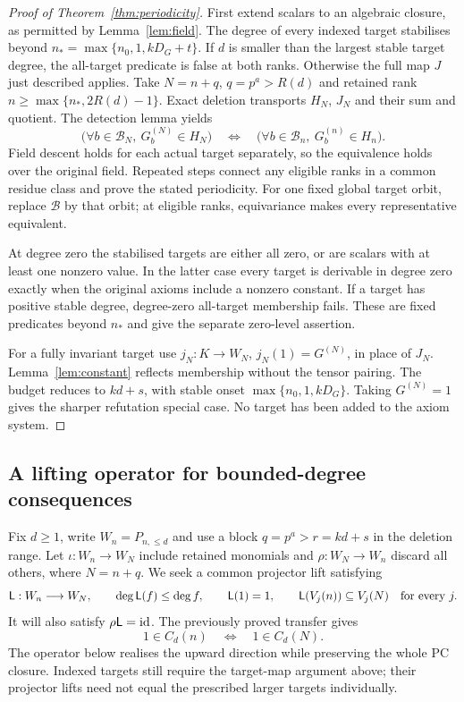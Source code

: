 \documentclass[11pt,a4paper]{article}
\theoremstyle{definition}\newtheorem{definition}[theorem]{Definition}
\theoremstyle{remark}\newtheorem{remark}[theorem]{Remark}
\begin{document}
\begin{proof}[Proof of Theorem~\ref{thm:periodicity}]
First extend scalars to an algebraic closure, as permitted by
Lemma~\ref{lem:field}. The degree of every indexed target stabilises
beyond $n_*=\max\{n_0,1,kD_G+t\}$. If $d$ is smaller than the
largest stable target degree, the all-target predicate is false at both
ranks. Otherwise the full map $J$ just described applies.
Take $N=n+q$, $q=p^a>R(d)$ and retained rank
$n\ge\max\{n_*,2R(d)-1\}$. Exact deletion transports $H_N$, $J_N$
and their sum and quotient. The detection lemma yields
\[
 \bigl(\forall b\in\mathcal B_N,\ G_b^{(N)}\in H_N\bigr)
 \quad\Longleftrightarrow\quad
 \bigl(\forall b\in\mathcal B_n,\ G_b^{(n)}\in H_n\bigr).
\]
Field descent holds for each actual target separately, so the equivalence
holds over the original field. Repeated steps connect any eligible
ranks in a common residue class and prove the stated periodicity.
For one fixed global target orbit, replace $\mathcal B$ by that orbit;
at eligible ranks, equivariance makes every representative equivalent.

At degree zero the stabilised targets are either all zero, or are
scalars with at least one nonzero value. In the latter case every target
is derivable in degree zero exactly when the original axioms include a
nonzero constant. If a target has positive stable degree, degree-zero
all-target membership fails. These are fixed predicates beyond $n_*$
and give the separate zero-level assertion.

For a fully invariant target use $j_N:K\to W_N$, $j_N(1)=G^{(N)}$,
in place of $J_N$. Lemma~\ref{lem:constant} reflects membership without
the tensor pairing. The budget reduces to $kd+s$, with stable onset
$\max\{n_0,1,kD_G\}$. Taking $G^{(N)}=1$ gives the sharper refutation
special case. No target has been added to the axiom system.
\end{proof}

\subsection{A lifting operator for bounded-degree consequences}
Fix $d\ge1$, write $W_n=P_{n,\le d}$ and use a block
$q=p^a>r=kd+s$ in the deletion range. Let
$\iota:W_n\to W_N$ include retained monomials and
$\rho:W_N\to W_n$ discard all others, where $N=n+q$.
We seek a common projector lift satisfying
\begin{equation}\label{eq:newcontract}
 \mathsf L:W_n\longrightarrow W_N,\qquad
 \deg\mathsf L(f)\le\deg f,\qquad\mathsf L(1)=1,\qquad
 \mathsf L(V_j(n))\subseteq V_j(N)\quad\text{for every }j.
\end{equation}
It will also satisfy $\rho\mathsf L=\mathrm{id}$. The previously proved
transfer gives
\begin{equation}\label{eq:newiff}
 1\in C_d(n)\quad\Longleftrightarrow\quad1\in C_d(N).
\end{equation}
The operator below realises the upward direction while preserving the
whole PC closure. Indexed targets still require the target-map
argument above; their projector lifts need not equal the prescribed
larger targets individually.
\end{document}
